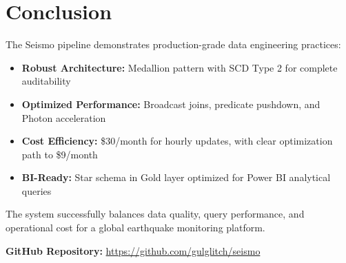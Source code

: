 \documentclass[11pt,a4paper]{article}
\begin{document}
\newpage

\section{Conclusion}

The Seismo pipeline demonstrates production-grade data engineering practices:

\begin{itemize}
    \item \textbf{Robust Architecture:} Medallion pattern with SCD Type 2 for complete auditability
    \item \textbf{Optimized Performance:} Broadcast joins, predicate pushdown, and Photon acceleration
    \item \textbf{Cost Efficiency:} \$30/month for hourly updates, with clear optimization path to \$9/month
    \item \textbf{BI-Ready:} Star schema in Gold layer optimized for Power BI analytical queries
\end{itemize}

The system successfully balances data quality, query performance, and operational cost for a global earthquake monitoring platform.

\vspace{1cm}

\noindent\textbf{GitHub Repository:} \url{https://github.com/gulglitch/seismo}
\end{document}
